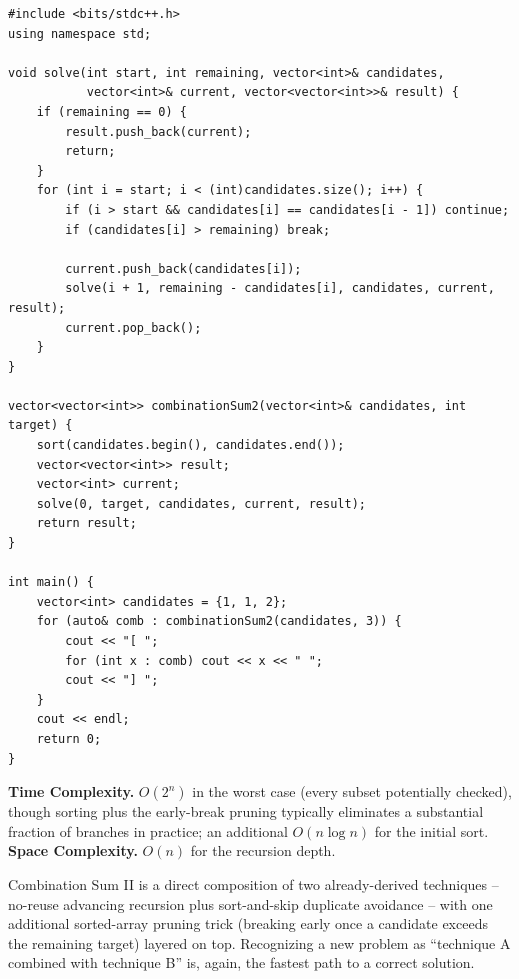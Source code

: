 \begin{lstlisting}
#include <bits/stdc++.h>
using namespace std;

void solve(int start, int remaining, vector<int>& candidates,
           vector<int>& current, vector<vector<int>>& result) {
    if (remaining == 0) {
        result.push_back(current);
        return;
    }
    for (int i = start; i < (int)candidates.size(); i++) {
        if (i > start && candidates[i] == candidates[i - 1]) continue;
        if (candidates[i] > remaining) break;

        current.push_back(candidates[i]);
        solve(i + 1, remaining - candidates[i], candidates, current, result);
        current.pop_back();
    }
}

vector<vector<int>> combinationSum2(vector<int>& candidates, int target) {
    sort(candidates.begin(), candidates.end());
    vector<vector<int>> result;
    vector<int> current;
    solve(0, target, candidates, current, result);
    return result;
}

int main() {
    vector<int> candidates = {1, 1, 2};
    for (auto& comb : combinationSum2(candidates, 3)) {
        cout << "[ ";
        for (int x : comb) cout << x << " ";
        cout << "] ";
    }
    cout << endl;
    return 0;
}
\end{lstlisting}

\begin{complexitybox}
\textbf{Time Complexity.} $O(2^n)$ in the worst case (every subset
potentially checked), though sorting plus the early-break pruning
typically eliminates a substantial fraction of branches in practice; an
additional $O(n \log n)$ for the initial sort.
\textbf{Space Complexity.} $O(n)$ for the recursion depth.
\end{complexitybox}

\begin{takeawaybox}
Combination Sum II is a direct composition of two already-derived
techniques -- no-reuse advancing recursion plus sort-and-skip duplicate
avoidance -- with one additional sorted-array pruning trick (breaking
early once a candidate exceeds the remaining target) layered on top.
Recognizing a new problem as ``technique A combined with technique B''
is, again, the fastest path to a correct solution.
\end{takeawaybox}
